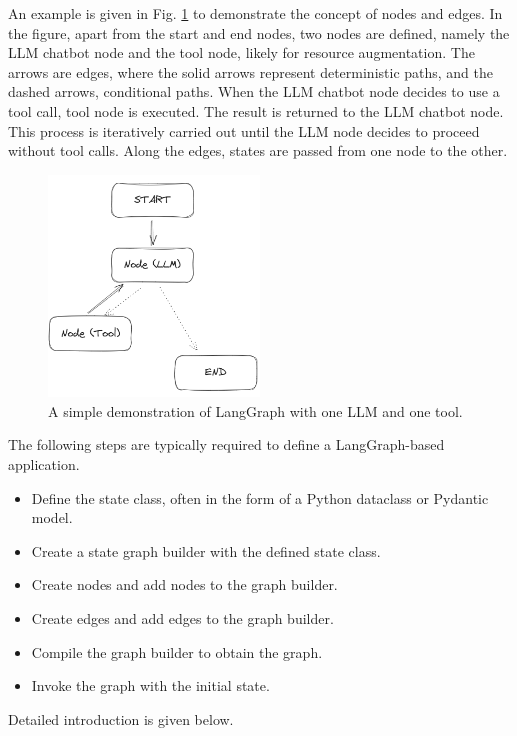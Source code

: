 An example is given in Fig. \ref{fig:langgraph_simpledemo} to demonstrate the concept of nodes and edges. In the figure, apart from the start and end nodes, two nodes are defined, namely the LLM chatbot node and the tool node, likely for resource augmentation. The arrows are edges, where the solid arrows represent deterministic paths, and the dashed arrows, conditional paths. When the LLM chatbot node decides to use a tool call, tool node is executed. The result is returned to the LLM chatbot node. This process is iteratively carried out until the LLM node decides to proceed without tool calls. Along the edges, states are passed from one node to the other.

\begin{figure}[!htb]
	\centering
	\includegraphics[width=0.5\textwidth]{./chapters/part-4/figures/langgraph_simpledemo.png}
	\caption{A simple demonstration of LangGraph with one LLM and one tool.}
	\label{fig:langgraph_simpledemo}
\end{figure}

The following steps are typically required to define a LangGraph-based application.
\begin{itemize}
  \item Define the state class, often in the form of a Python dataclass or Pydantic model.
  \item Create a state graph builder with the defined state class.
  \item Create nodes and add nodes to the graph builder.
  \item Create edges and add edges to the graph builder.
  \item Compile the graph builder to obtain the graph.
  \item Invoke the graph with the initial state.
\end{itemize}

Detailed introduction is given below.


